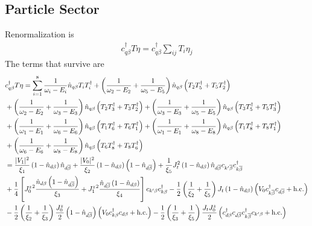 \documentclass[12pt,twoside]{article}
\numberwithin{equation}{section}
\begin{document}
\subsection{Particle Sector}
Renormalization is
\begin{equation}\begin{aligned}
	c^\dagger_{q\beta}T \eta = c^\dagger_{q\beta}\sum_{ij}T_i \eta_j
\end{aligned}\end{equation}
The terms that survive are
\begin{equation}\begin{aligned}
& c^\dagger_{q\beta}T \eta
= \sum_{i=1}^8\frac{1}{\omega_i - E_i}\hat n_{q\beta} T_i T_i^\dagger +\left(\frac{1}{\omega_2 - E_2} + \frac{1}{\omega_5 - E_5}\right)\hat n_{q\beta} \left(T_2 T_5^\dagger + T_5 T_2^\dagger \right) \\
& +\left(\frac{1}{\omega_2 - E_2} + \frac{1}{\omega_3 - E_3}\right)\hat n_{q\beta} \left(T_2 T_3^\dagger + T_3 T_2^\dagger \right) + \left(\frac{1}{\omega_3 - E_3} + \frac{1}{\omega_5 - E_5}\right)\hat n_{q\beta} \left(T_3 T_5^\dagger + T_5 T_3^\dagger \right) \\
& + \left(\frac{1}{\omega_1 - E_1} + \frac{1}{\omega_6 - E_6}\right)\hat n_{q\beta} \left(T_1 T_6^\dagger + T_6 T_1^\dagger \right) + \left(\frac{1}{\omega_1 - E_1} + \frac{1}{\omega_8 - E_8}\right)\hat n_{q\beta} \left(T_1 T_8^\dagger + T_8 T_1^\dagger \right) \\
& + \left(\frac{1}{\omega_6 - E_6} + \frac{1}{\omega_8 - E_8}\right)\hat n_{q\beta} \left(T_6 T_8^\dagger + T_8 T_6^\dagger \right)\\
&=\frac{|V_1|^2}{\xi_1}\left( 1 - \hat n_{d\beta} \right) \hat n_{d\ol\beta} + \frac{|V_0|^2}{\xi_2}\left( 1 - \hat n_{d\beta} \right) \left( 1 - \hat n_{d\ol\beta} \right) + \frac{1}{\xi_5}J_t^2 \left( 1 - \hat n_{d\beta} \right) \hat n_{d\ol\beta} c_{k^\prime\ol\beta}c^\dagger_{k\ol\beta} \\
&+ \frac{1}{4}\left[ {J_0^z}^2\frac{\hat n_{d\beta}\left( 1 - \hat n_{d\ol\beta} \right) }{\xi_3} + {J_1^z}^2\frac{\hat n_{d\ol\beta}\left( 1 - \hat n_{d\beta} \right)}{\xi_4} \right]c_{k^\prime\beta}c^\dagger_{k\beta} - \frac{1}{2} \left(\frac{1}{\xi_2} + \frac{1}{\xi_5}\right)J_t\left( 1 - \hat n_{d\beta}\right) \left(V_0 c^\dagger_{k\ol\beta}c_{d\ol\beta} + \text{h.c.}\right) \\
&- \frac{1}{2}\left(\frac{1}{\xi_2} + \frac{1}{\xi_3}\right)\frac{J^z_0}{2}\left(1 - \hat n_{d\ol\beta}\right)\left(V_0 c^\dagger_{k\beta}c_{d\beta} + \text{h.c.}\right) - \frac{1}{2}\left(\frac{1}{\xi_3} + \frac{1}{\xi_5}\right)\frac{J_t J^z_0}{2}\left(c^\dagger_{d\beta}c_{d\ol\beta}c^\dagger_{k\ol\beta}c_{k^\prime\beta} + \text{h.c.}\right) \\

\end{aligned}
\end{equation}
\end{document}
